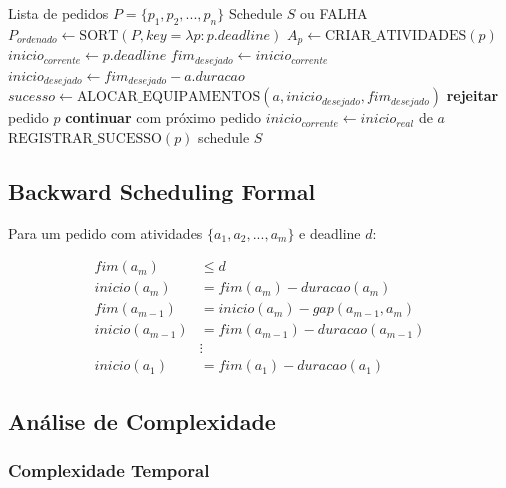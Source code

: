 \documentclass[12pt,a4paper]{article}
\theoremstyle{definition}
\begin{document}
\begin{algorithm}[H]
\caption{Scheduling Sequencial}
\label{alg:sequencial}
\begin{algorithmic}[1]
\REQUIRE Lista de pedidos $P = \{p_1, p_2, ..., p_n\}$
\ENSURE Schedule $S$ ou FALHA
\STATE $P_{ordenado} \leftarrow \text{SORT}(P, key=\lambda p: p.deadline)$
    \STATE $A_p \leftarrow \text{CRIAR\_ATIVIDADES}(p)$
    \STATE $inicio_{corrente} \leftarrow p.deadline$
        \STATE $fim_{desejado} \leftarrow inicio_{corrente}$
        \STATE $inicio_{desejado} \leftarrow fim_{desejado} - a.duracao$
        \STATE $sucesso \leftarrow \text{ALOCAR\_EQUIPAMENTOS}(a, inicio_{desejado}, fim_{desejado})$
            \STATE \textbf{rejeitar} pedido $p$
            \STATE \textbf{continuar} com próximo pedido
        \ENDIF
        \STATE $inicio_{corrente} \leftarrow inicio_{real}$ de $a$
    \ENDFOR
    \STATE $\text{REGISTRAR\_SUCESSO}(p)$
\ENDFOR
\RETURN schedule $S$
\end{algorithmic}
\end{algorithm}

\subsection{Backward Scheduling Formal}

Para um pedido com atividades $\{a_1, a_2, ..., a_m\}$ e deadline $d$:

\begin{align}
fim(a_m) &\leq d \\
inicio(a_m) &= fim(a_m) - duracao(a_m) \\
fim(a_{m-1}) &= inicio(a_m) - gap(a_{m-1}, a_m) \\
inicio(a_{m-1}) &= fim(a_{m-1}) - duracao(a_{m-1}) \\
&\vdots \nonumber \\
inicio(a_1) &= fim(a_1) - duracao(a_1)
\end{align}

\subsection{Análise de Complexidade}

\subsubsection{Complexidade Temporal}
\end{document}
